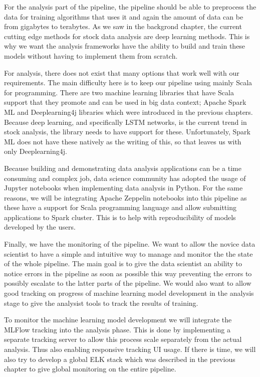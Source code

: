 For the analysis part of the pipeline, the pipeline should be able to preprocess the data for training algorithms that uses it and again the amount of data can be from gigabytes to terabytes.
As we saw in the backgrond chapter, the current cutting edge methods for stock data analysis are deep learning methods.
This is why we want the analysis frameworks have the ability to build and train these models without having to implement them from scratch.

For analysis, there does not exist that many options that work well with our requirements.
The main difficulty here is to keep our pipeline using mainly Scala for programming.
There are two machine learning libraries that have Scala support that they promote and can be used in big data context; Apache Spark ML and Deeplearning4j libraries which were introduced in the previous chapters.
Because deep learning, and specifically LSTM networks, is the current trend in stock analysis, the library needs to have support for these.
Unfortunately, Spark ML does not have these natively as the writing of this, so that leaves us with only Deeplearning4j.

Because building and demonstrating data analysis applications can be a time consuming and complex job, data science community has adopted the usage of Jupyter notebooks when implementing data analysis in Python.
For the same reasons, we will be integrating Apache Zeppelin notebooks into this pipeline as these have a support for Scala programming language and allow submitting applications to Spark cluster.
This is to help with reproducibility of models developed by the users.

Finally, we have the monitoring of the pipeline.
We want to allow the novice data scientist to have a simple and intuitive way to manage and monitor the the state of the whole pipeline.
The main goal is to give the data scientist an ability to notice errors in the pipeline as soon as possible this way preventing the errors to possibly escalate to the latter parts of the pipeline.
We would also want to allow good tracking on progress of machine learning model development in the analysis stage to give the analysist tools to track the results of training.

To monitor the machine learning model development we will integrate the MLFlow tracking into the analysis phase.
This is done by implementing a separate tracking server to allow this process scale separately from the actual analysis.
Thus also enabling responsive tracking UI usage.
If there is time, we will also try to develop a global ELK stack which was described in the previous chapter to give global monitoring on the entire pipeline.


